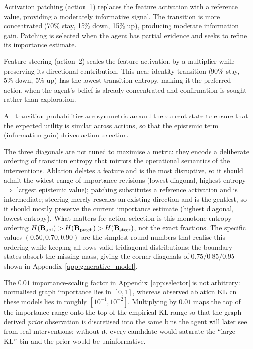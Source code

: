 Activation patching (action~1) replaces the feature
activation with a reference value, providing a moderately
informative signal.  The transition is more concentrated
(70\% stay, 15\% down, 15\% up), producing moderate information
gain.  Patching is selected when the agent has partial evidence
and seeks to refine its importance estimate.

Feature steering (action~2) scales the feature activation
by a multiplier while preserving its directional contribution.
This near-identity transition (90\% stay, 5\% down, 5\% up) has
the lowest transition entropy, making it the preferred action
when the agent's belief is already concentrated and confirmation
is sought rather than exploration.

All transition probabilities are symmetric around the current state
to ensure that the expected utility is similar across actions, so
that the epistemic term (information gain) drives action selection.

The three diagonals are not tuned to
maximise a metric; they encode a deliberate ordering of transition entropy
that mirrors the operational semantics of the interventions. Ablation deletes a
feature and is the most disruptive, so it should admit the widest range of
importance revisions (lowest diagonal, highest entropy $\Rightarrow$ largest
epistemic value); patching substitutes a reference activation and is intermediate;
steering merely rescales an existing direction and is the gentlest, so it should
mostly preserve the current importance estimate (highest diagonal, lowest entropy).
What matters for action selection is this monotone entropy ordering
$H(\mathbf{B}_{\text{abl}}) > H(\mathbf{B}_{\text{patch}}) > H(\mathbf{B}_{\text{steer}})$,
not the exact fractions. The specific values $(0.50,0.70,0.90)$ are the simplest
round numbers that realise this ordering while keeping all rows valid tridiagonal
distributions; the boundary states absorb the missing mass, giving the corner
diagonals of $0.75/0.85/0.95$ shown in
Appendix~\ref{app:generative_model}.

The $0.01$ importance-scaling factor in
Appendix~\ref{app:selector} is not arbitrary: normalised graph importance lies in
$[0,1]$, whereas observed ablation KL on these models lies in roughly
$[10^{-4},10^{-2}]$. Multiplying by $0.01$ maps the top of the importance range onto
the top of the empirical KL range so that the graph-derived \emph{prior} observation
is discretised into the same bins the agent will later see from real interventions;
without it, every candidate would saturate the ``large-KL'' bin and the prior would
be uninformative.

